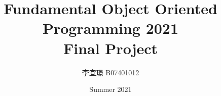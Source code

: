 \title{Fundamental Object Oriented Programming 2021 \\ Final Project} %
\author{李宜璟 B07401012}
\date{Summer 2021}
\begin{titlingpage}
\null  %
\nointerlineskip  %
\vfill
\let\snewpage \newpage
\let\newpage \relax
\maketitle
\thispagestyle{empty}
\let \newpage \snewpage
\vfill 
\break %
\end{titlingpage}

